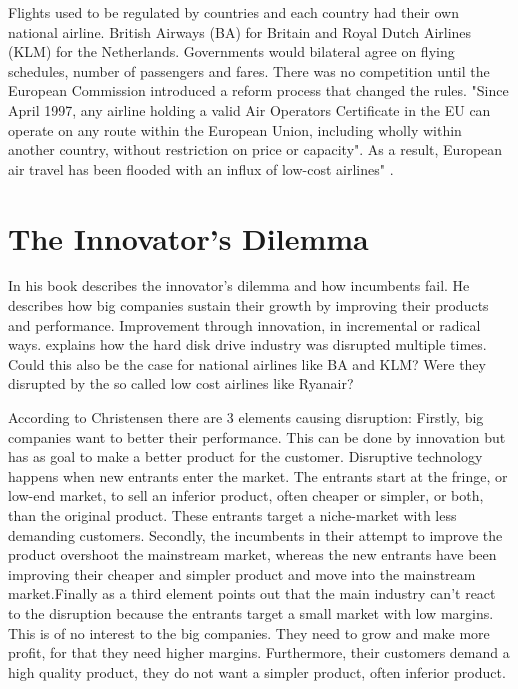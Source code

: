 \documentclass[a4paper, 11pt]{article}
\begin{document}
Flights used to be regulated by countries and each country had their own national airline. British Airways (BA) for Britain and Royal Dutch Airlines (KLM) for the Netherlands. Governments would bilateral agree on flying schedules, number of
passengers and fares. There was no competition until the European Commission introduced a reform process that changed the
rules. "Since April 1997, any airline holding a valid Air Operators Certificate in the EU can operate on any route within the
European Union, including wholly within another country, without restriction on price or capacity". As a result, European air
travel has been flooded with an influx of low-cost airlines" \citep{Campaign}.

\section{The Innovator's Dilemma}


In his book \cite{Christensen97} describes the innovator's dilemma and how incumbents fail. He describes how big companies sustain their growth by improving their products and performance. Improvement through innovation, in incremental or radical ways. \citep{Christensen97} explains how the hard disk drive industry was disrupted multiple times. Could this also be the case for national airlines like BA and KLM? Were they disrupted by the so called low cost airlines like Ryanair?

According to Christensen \cite{Christensen97} there are 3 elements causing disruption: Firstly, big companies want to better their performance. This can be done by innovation but has as goal to make a better product for the customer. Disruptive technology happens when new entrants enter the market. The entrants start at the fringe, or low-end market, to sell an inferior product, often cheaper or simpler, or both, than the original product. These entrants target a niche-market with less demanding customers. Secondly, the incumbents in their attempt to improve the product overshoot the mainstream market, whereas the new entrants have been improving their cheaper and simpler product and move into the mainstream market.Finally as a third element \cite{Christensen97} points out that the main industry can't react to the disruption because the entrants target a small market with low margins. This is of no interest to the big companies. They need to grow and make more profit, for that they need higher margins. Furthermore, their customers demand a high quality product, they do not want a simpler product, often inferior product.
\end{document}
